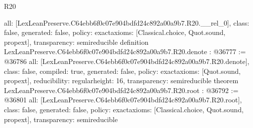 \begin{lexlean}{R20}
\begin{coremodule}
{  all: [LexLeanPreserve.C64ebb6f0c07e904bdfd24c892a00a9b7.R20.__rel_0],
  class: false,
  generated: false,
  policy: exact{axioms: [Classical.choice, Quot.sound, propext]},
  transparency: semireducible
}
definition LexLeanPreserve.C64ebb6f0c07e904bdfd24c892a00a9b7.R20.denote : @36777 := @36786 {
  all: [LexLeanPreserve.C64ebb6f0c07e904bdfd24c892a00a9b7.R20.denote],
  class: false,
  compiled: true,
  generated: false,
  policy: exact{axioms: [Quot.sound, propext]},
  reducibility: regular{height: 16},
  transparency: semireducible
}
theorem LexLeanPreserve.C64ebb6f0c07e904bdfd24c892a00a9b7.R20.root : @36792 := @36801 {
  all: [LexLeanPreserve.C64ebb6f0c07e904bdfd24c892a00a9b7.R20.root],
  class: false,
  generated: false,
  policy: exact{axioms: [Classical.choice, Quot.sound, propext]},
  transparency: semireducible
}


\end{coremodule}
\end{lexlean}
